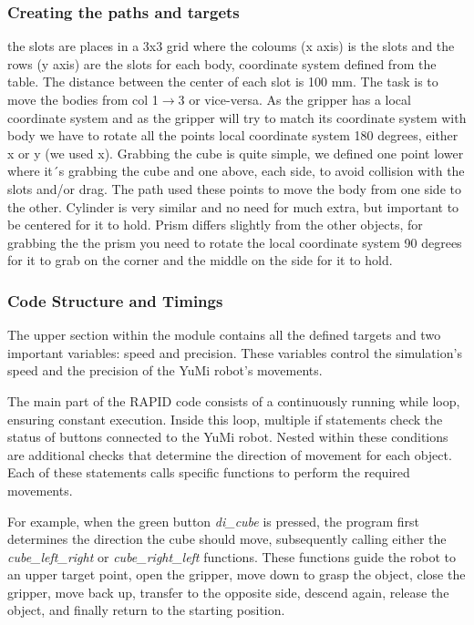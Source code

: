 \documentclass[a4paper,12pt]{article}
\begin{document}
\subsubsection{Creating the paths and targets}
the slots are places in a 3x3 grid where the coloums (x axis) is the slots and the rows (y axis) are the slots for each body, coordinate system defined from the table. The distance between the center of each slot is 100 mm. The task is to move the bodies from col 1$\rightarrow$3 or vice-versa. 
As the gripper has a local coordinate system and as the gripper will try to match its coordinate system with body we have to rotate all the points local coordinate system 180 degrees, either x or y (we used x).
Grabbing the cube is quite simple, we defined one point lower where it´s grabbing the cube and one above, each side, to avoid collision with the slots and/or drag. The path used these points to move the body from one side to the other.
Cylinder is very similar and no need for much extra, but important to be centered for it to hold.
Prism differs slightly from the other objects, for grabbing the the prism you need to rotate the local coordinate system 90 degrees for it to grab on the corner and the middle on the side for it to hold.  

\subsubsection{Code Structure and Timings}
The upper section within the module contains all the defined targets and two important variables: speed and precision. These variables control the simulation's speed and the precision of the YuMi robot's movements.

The main part of the RAPID code consists of a continuously running while loop, ensuring constant execution. Inside this loop, multiple if statements check the status of buttons connected to the YuMi robot. Nested within these conditions are additional checks that determine the direction of movement for each object. Each of these statements calls specific functions to perform the required movements.

For example, when the green button \textit{di\_cube} is pressed, the program first determines the direction the cube should move, subsequently calling either the \textit{cube\_left\_right} or \textit{cube\_right\_left} functions. These functions guide the robot to an upper target point, open the gripper, move down to grasp the object, close the gripper, move back up, transfer to the opposite side, descend again, release the object, and finally return to the starting position.
\end{document}
